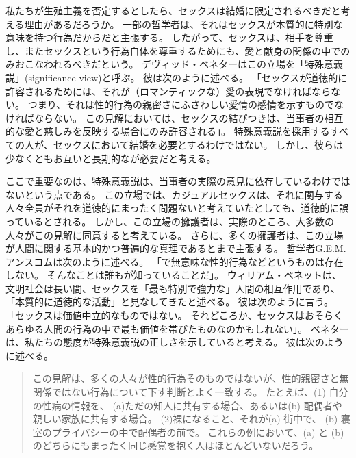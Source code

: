 \documentclass[paper=a4,book,openany]{jlreq}
\begin{document}
私たちが生殖主義を否定するとしたら、セックスは結婚に限定されるべきだと考える理由があるだろうか。
一部の哲学者は、それはセックスが本質的に特別な意味を持つ行為だからだと主張する。
したがって、セックスは、相手を尊重し、またセックスという行為自体を尊重するためにも、愛と献身の関係の中でのみおこなわれるべきだという。
デヴィッド・ベネターはこの立場を「特殊意義説」(significance view)と呼ぶ。
彼は次のように述べる。
「セックスが道徳的に許容されるためには、それが（ロマンティックな）愛の表現でなければならない。
つまり、それは性的行為の親密さにふさわしい愛情の感情を示すものでなければならない。
この見解においては、セックスの結びつきは、当事者の相互的な愛と慈しみを反映する場合にのみ許容される」\citep[p.182]{benatar02:_two_views_sexual_ethic}。
特殊意義説を採用するすべての人が、セックスにおいて結婚を必要とするわけではない。
しかし、彼らは少なくともお互いと長期的なが必要だと考える。

ここで重要なのは、特殊意義説は、当事者の実際の意見に依存しているわけではないという点である。
この立場では、カジュアルセックスは、それに関与する人々全員がそれを道徳的にまったく問題ないと考えていたとしても、道徳的に誤っているとされる。
しかし、この立場の擁護者は、実際のところ、大多数の人々がこの見解に同意すると考えている。
さらに、多くの擁護者は、この立場が人間に関する基本的かつ普遍的な真理であるとまで主張する。
哲学者G.E.M. アンスコムは次のように述べる。
「で無意味な性的行為などというものは存在しない。
そんなことは誰もが知っていることだ」\citep{anscombe72contraception}。
ウィリアム・ベネットは、文明社会は長い間、セックスを「最も特別で強力な」人間の相互作用であり、「本質的に道徳的な活動」と見なしてきたと述べる。
彼は次のように言う。
「セックスは価値中立的なものではない。
それどころか、セックスはおそらくあらゆる人間の行為の中で最も価値を帯びたものなのかもしれない」\citep[p.19]{bennett98:_death_outrag}。
ベネターは、私たちの態度が特殊意義説の正しさを示していると考える。
彼は次のように述べる。

\begin{quote}
  この見解は、多くの人々が性的行為そのものではないが、性的親密さと無関係ではない行為について下す判断とよく一致する。
たとえば、(1) 自分の性病の情報を、 (a)ただの知人に共有する場合、あるいは(b) 配偶者や親しい家族に共有する場合。
(2)裸になること、それが(a) 街中で、 (b) 寝室のプライバシーの中で配偶者の前で。
これらの例において、(a) と (b) のどちらにもまったく同じ感覚を抱く人はほとんどいないだろう。
\citep[p.197]{benatar02:_two_views_sexual_ethic}
\end{quote}
\end{document}

